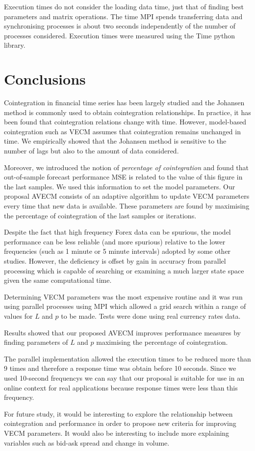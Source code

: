 Execution times do not consider the loading data time, just that of finding best
parameters and matrix operations. The time MPI spends transferring data and
synchronising processes is about two seconds independently of the number of
processes considered. Execution times were measured using the Time python
library.

\section{Conclusions}
\label{sec:conclusions}
Cointegration in financial time series has been largely studied and the Johansen
method is commonly used to obtain cointegration relationships.  In practice, it
has been found that cointegration relations change with time.  However,
model-based cointegration such as VECM assumes that cointegration remains
unchanged in time.  We empirically showed that the Johansen method is sensitive
to the number of lags but also to the amount of data considered.

Moreover, we introduced the notion of {\em percentage of cointegration\/} and
found that out-of-sample forecast performance MSE is related to the value of
this figure in the last samples.  We used this information to set the model
parameters.  Our proposal AVECM consists of an adaptive algorithm to update VECM
parameters every time that new data is available. These parameters are found by
maximising the percentage of cointegration of the last samples or iterations.

Despite the fact that high frequency Forex data can be spurious, the model
performance can be less reliable (and more spurious) relative to the lower
frequencies (such as 1 minute or 5 minute intervals) adopted by some other
studies. However, the deficiency is offset by gain in accuracy from parallel
processing which is capable of searching or examining a much larger state space
given the same computational time.

Determining VECM parameters was the most expensive routine and it was run using
parallel processes using MPI which allowed a grid search within a range of
values for $L$ and $p$ to be made.  Tests were done using real currency rates
data.  

Results showed that our proposed AVECM improves performance measures by finding
parameters of $L$ and $p$ maximising the percentage of cointegration. 

The parallel implementation allowed the execution times to be reduced more than
9 times and therefore a response time was obtain before 10 seconds. Since we
used 10-second frequencys we can say that our proposal is suitable for use in
an online context for real applications because response times were less than
this frequency.

For future study, it would be interesting to explore the relationship between
cointegration and performance in order to propose new criteria for improving
VECM parameters. It would also be interesting to include more explaining
variables such as bid-ask spread and change in volume.


